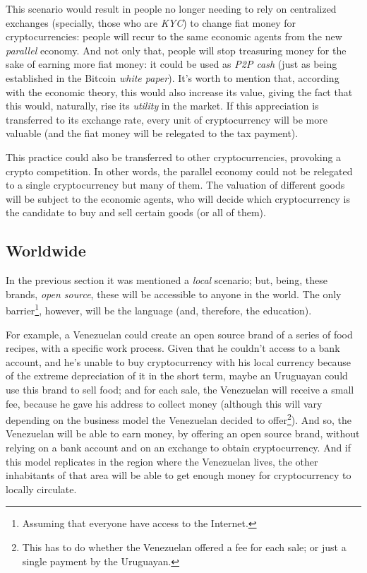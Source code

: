 \documentclass[12pt,a4paper]{article}
\begin{document}
This scenario would result in people no longer needing to rely on centralized exchanges (specially, those who are \textit{KYC}) to change fiat money for cryptocurrencies: people will recur to the same economic agents from the new \textit{parallel} economy. And not only that, people will stop treasuring money for the sake of earning more fiat money: it could be used as \textit{P2P cash} (just as being established in the Bitcoin \textit{white paper}). It's worth to mention that, according with the economic theory, this would also increase its value, giving the fact that this would, naturally, rise its \textit{utility} in the market. If this appreciation is transferred to its exchange rate, every unit of cryptocurrency will be more valuable (and the fiat money will be relegated to the tax payment).

This practice could also be transferred to other cryptocurrencies, provoking a crypto competition. In other words, the parallel economy could not be relegated to a single cryptocurrency but many of them. The valuation of different goods will be subject to the economic agents, who will decide which cryptocurrency is the candidate to buy and sell certain goods (or all of them).

\subsection{Worldwide}
In the previous section it was mentioned a \textit{local} scenario; but, being, these brands, \textit{open source}, these will be accessible to anyone in the world. The only barrier\footnote{Assuming that everyone have access to the Internet.}, however, will be the language (and, therefore, the education).

For example, a Venezuelan could create an open source brand of a series of food recipes, with a specific work process. Given that he couldn't access to a bank account, and he's unable to buy cryptocurrency with his local currency because of the extreme depreciation of it in the short term, maybe an Uruguayan could use this brand to sell food; and for each sale, the Venezuelan will receive a small fee, because he gave his address to collect money (although this will vary depending on the business model the Venezuelan decided to offer\footnote{This has to do whether the Venezuelan offered a fee for each sale; or just a single payment by the Uruguayan.}). And so, the Venezuelan will be able to earn money, by offering an open source brand, without relying on a bank account and on an exchange to obtain cryptocurrency. And if this model replicates in the region where the Venezuelan lives, the other inhabitants of that area will be able to get enough money for cryptocurrency to locally circulate.
\end{document}
